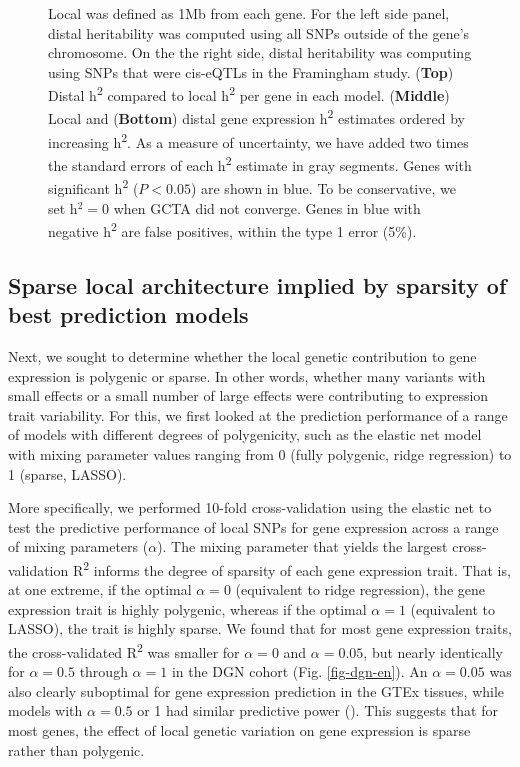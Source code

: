 \documentclass[10pt,letterpaper]{article}
\begin{document}
\begin{figure}[H]
{Local was defined as 1Mb from each gene. For the left side panel, distal heritability was computed using all SNPs outside of the gene's chromosome. On the the right side, distal heritability was computing using SNPs that were cis-eQTLs in the Framingham study.
%
(\textbf{Top}) Distal h\textsuperscript{2} compared to local
h\textsuperscript{2} per gene in each model. (\textbf{Middle}) Local and
(\textbf{Bottom}) distal gene expression h\textsuperscript{2} estimates
ordered by increasing h\textsuperscript{2}. 
As a measure of uncertainty, we have added two times the standard errors of each h\textsuperscript{2} estimate in gray segments. Genes with significant h\textsuperscript{2} ($P<0.05$) are shown in blue.  To be conservative, we set h$^2=0$ when GCTA did not converge. Genes in blue with negative h\textsuperscript{2} are false positives, within the type 1 error (5\%).
}
\label{fig-dgn-jt-h2}
\end{figure}


\subsection*{Sparse local architecture implied by sparsity of best prediction models }\label{the-effect-of-local-genetic-variation-on-gene-expression-is-sparse-rather-than-polygenic}

Next, we sought to determine whether the local genetic contribution to gene expression is polygenic or sparse. In other words, whether many variants with small effects or a small number of large effects were contributing to expression trait variability. For this, we first looked at the prediction performance of a range of models with different degrees of polygenicity, such as the elastic net model with  mixing parameter values ranging from 0 (fully polygenic, ridge regression) to 1 (sparse, LASSO).

More specifically, we performed 10-fold cross-validation using the elastic net \cite{Zou_2005} to test the predictive performance of local SNPs for gene expression across a range of mixing parameters ($\alpha$). The mixing parameter that yields the largest cross-validation R\textsuperscript{2} informs the degree of sparsity of each gene expression trait. That is, at one extreme, if the optimal \(\alpha=0\) (equivalent to ridge regression), the gene expression trait is highly polygenic, whereas if the optimal \(\alpha=1\) (equivalent to LASSO), the trait is highly sparse. We found that for most gene expression traits, the cross-validated R\textsuperscript{2} was smaller for \(\alpha=0\) and \(\alpha=0.05\), but nearly identically for \(\alpha=0.5\) through \(\alpha=1\) in the DGN cohort (Fig. \ref{fig-dgn-en}). An \(\alpha=0.05\) was also clearly suboptimal for gene expression prediction in the GTEx tissues, while models with \(\alpha=0.5\) or 1 had similar predictive power (). This suggests that for most genes, the effect of local genetic variation on gene expression is sparse rather than polygenic.
\end{document}
